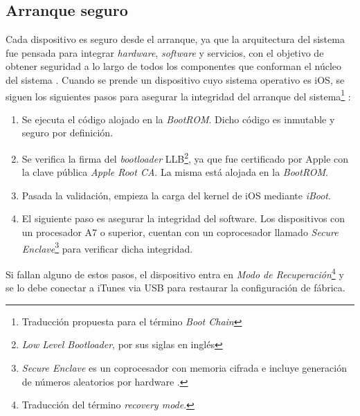 \subsection{Arranque seguro}\label{fig:ch02:arranque}
Cada dispositivo es seguro desde el arranque, ya que la arquitectura del sistema fue pensada para integrar \textit{hardware}, \textit{software} y servicios, con el objetivo de obtener seguridad a lo largo de todos los componentes que conforman el núcleo del sistema \cite{asg}. Cuando se prende un dispositivo cuyo sistema operativo es iOS, se siguen los siguientes pasos para asegurar la integridad del arranque del sistema\footnote{Traducción propuesta para el término \textit{Boot Chain}} :
\begin{enumerate}
	\item Se ejecuta el código alojado en la \textit{BootROM}. Dicho código es inmutable y seguro por definición.
	\item Se verifica la firma del \textit{bootloader} LLB\footnote{\textit{Low Level Bootloader}, por sus siglas en inglés}, ya que fue certificado por Apple con la clave pública \textit{Apple Root CA}. La misma está alojada en la \textit{BootROM}. 
	\item Pasada la validación, empieza la carga del kernel de iOS mediante \textit{iBoot}.
	\item El siguiente paso es asegurar la integridad del software. Los dispositivos con un procesador A7 o superior, cuentan con un coprocesador llamado \textit{Secure Enclave}\footnote{\textit{Secure Enclave} es un coprocesador con memoria cifrada e incluye generación de números aleatorios por hardware \cite{asg}.} para verificar dicha integridad.
\end{enumerate}
Si fallan alguno de estos pasos, el dispositivo entra en \emph{Modo de Recuperación}\footnote{Traducción del término \textit{recovery mode}.} y se lo debe conectar a iTunes via USB para restaurar la configuración de fábrica.\\

